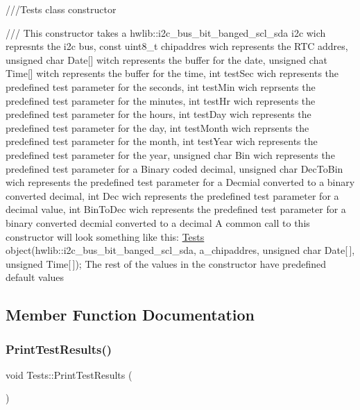 ///\+Tests class constructor 

/// This constructor takes a hwlib\+::i2c\+\_\+bus\+\_\+bit\+\_\+banged\+\_\+scl\+\_\+sda i2c wich represnts the i2c bus, const uint8\+\_\+t chipaddres wich represents the R\+TC addres, unsigned char Date\mbox{[}\mbox{]} witch represents the buffer for the date, unsigned chat Time\mbox{[}\mbox{]} witch represents the buffer for the time, int test\+Sec wich represents the predefined test parameter for the seconds, int test\+Min wich reprsents the predefined test parameter for the minutes, int test\+Hr wich represents the predefined test parameter for the hours, int test\+Day wich represents the predefined test parameter for the day, int test\+Month wich reprsents the predefined test parameter for the month, int test\+Year wich represents the predefined test parameter for the year, unsigned char Bin wich represents the predefined test parameter for a Binary coded decimal, unsigned char Dec\+To\+Bin wich represents the predefined test parameter for a Decmial converted to a binary converted decimal, int Dec wich represents the predefined test parameter for a decimal value, int Bin\+To\+Dec wich represents the predefined test parameter for a binary converted decmial converted to a decimal A common call to this constructor will look something like this\+: \hyperlink{classTests}{Tests} object(hwlib\+::i2c\+\_\+bus\+\_\+bit\+\_\+banged\+\_\+scl\+\_\+sda, a\+\_\+chipaddres, unsigned char Date\mbox{[}$\,$\mbox{]}, unsigned Time\mbox{[}$\,$\mbox{]}); The rest of the values in the constructor have predefined default values 

\subsection{Member Function Documentation}
\mbox{\label{classTests_ae29be1edf96424ad0f81a15bbf5b983e}} 
\subsubsection{\texorpdfstring{Print\+Test\+Results()}{PrintTestResults()}}
{\footnotesize\ttfamily void Tests\+::\+Print\+Test\+Results (\begin{DoxyParamCaption}{ }\end{DoxyParamCaption})}



